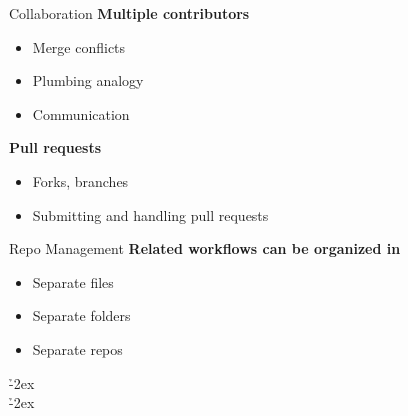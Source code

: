 \documentclass[aspectratio=169]{beamer}
\begin{document}



\begin{frame}{Collaboration}\small
  \vspace{4ex}
  {\bf\darkgreen Multiple contributors}\\
  \begin{itemize}
    \item[] Merge conflicts
    \item[] Plumbing analogy
    \item[] Communication
  \end{itemize}
  \vspace{6ex}
  {\bf\darkgreen Pull requests}\\
  \begin{itemize}
    \item[] Forks, branches
    \item[] Submitting and handling pull requests
  \end{itemize}
  \vspace{4ex}
\end{frame}




\begin{frame}{Repo Management}\small
  \vspace{4ex}
  {\bf\darkgreen Related workflows can be organized in}\\
  \begin{itemize}
    \item[] Separate files
    \item[] Separate folders
    \item[] Separate repos
  \end{itemize}
  \vspace{3ex}
  \h{-2ex}\\[2ex]
  \h{-2ex}
  \vspace{4ex}
\end{frame}
\end{document}
